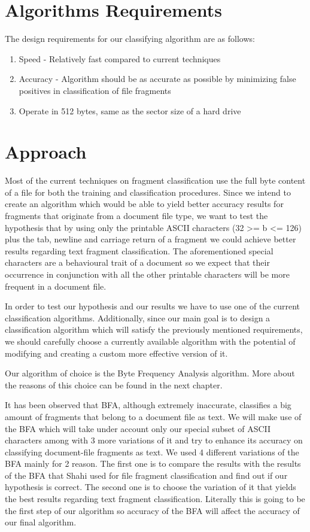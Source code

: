 \section{Algorithms Requirements}
The design requirements for our classifying algorithm are as follows:
\begin{enumerate}
\item Speed - Relatively fast compared to current techniques
\item Accuracy - Algorithm should be as accurate as possible by minimizing false positives in classification of file fragments
\item Operate in 512 bytes, same as the sector size of a hard drive

\end{enumerate}


\section{Approach}
Most of the current techniques on fragment classification use the full byte content of a file for both the training and classification procedures. Since we intend to create an algorithm which would be able to yield better accuracy results for fragments that originate from a document file type, we want to test the hypothesis that by using only the printable ASCII characters (32 >= b <= 126) plus the tab, newline and carriage return of a fragment we could achieve better results regarding text fragment classification. The aforementioned special characters are a behavioural trait of a document so we expect that their occurrence in conjunction with all the other printable characters will be more frequent in a document file.

In order to test our hypothesis and our results we have to use one of the current classification algorithms. Additionally, since our main goal is to design a classification algorithm  which will satisfy the previously mentioned requirements, we should carefully choose a currently available algorithm with the potential of modifying and creating a custom more effective version of it.

Our algorithm of choice is the Byte Frequency Analysis algorithm. More about the reasons of this choice can be found in the next chapter.


 It has been observed that BFA, although extremely inaccurate, classifies a big amount of fragments that belong to a document file as text. We will make use of the BFA which will take under account only our special subset of ASCII characters among with 3 more variations of it and try to enhance its accuracy on classifying document-file fragments as text.  We used 4 different variations of the BFA mainly for 2 reason.  The first one is to compare the results with the results of the BFA that Shahi used for file fragment classification and find out if our hypothesis is correct. The second one is to choose the variation of it that yields the best results regarding text fragment classification. Literally this is going to be the first step of our algorithm so accuracy of the BFA will affect the accuracy of our final algorithm.

